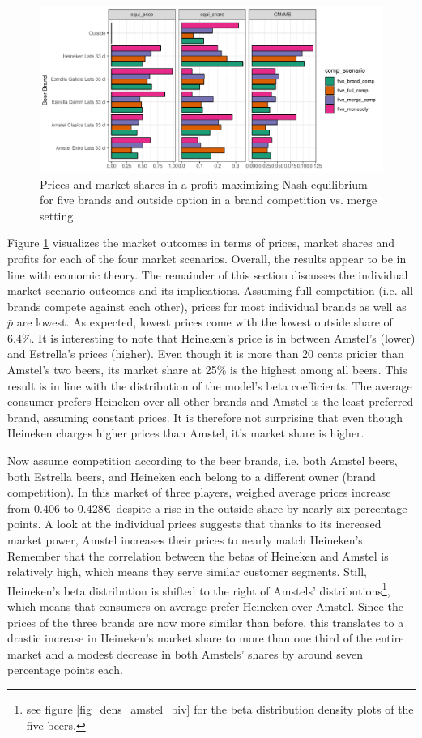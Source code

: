 \documentclass[12pt,a4paper]{article}
\begin{document}
\begin{figure}[ht]
	\centering
  \includegraphics[scale = 0.7]{figures/bar_price_share_brand_merge_5.pdf}
	\caption{Prices and market shares in a profit-maximizing Nash equilibrium for five brands and outside option in a brand competition vs. merge setting}
	\label{fig_bar_five}
\end{figure}

Figure \ref{fig_bar_five} visualizes the market outcomes in terms of prices, market shares and profits for each of the four market scenarios.
Overall, the results appear to be in line with economic theory.
The remainder of this section discusses the individual market scenario outcomes and its implications.
Assuming full competition (i.e. all brands compete against each other), prices for most individual brands as well as $\bar{p}$ are lowest.
As expected, lowest prices come with the lowest outside share of 6.4\%.
It is interesting to note that Heineken's price is in between Amstel's (lower) and Estrella's prices (higher).
Even though it is more than 20 cents pricier than Amstel's two beers, its market share at 25\% is the highest among all beers.
This result is in line with the distribution of the model's beta coefficients.
The average consumer prefers Heineken over all other brands and Amstel is the least preferred brand, assuming constant prices.
It is therefore not surprising that even though Heineken charges higher prices than Amstel, it's market share is higher.

Now assume competition according to the beer brands, i.e. both Amstel beers, both Estrella beers, and Heineken each belong to a different owner (brand competition).
In this market of three players, weighed average prices increase from 0.406 to 0.428\euro\ despite a rise in the outside share by nearly six percentage points.
A look at the individual prices suggests that thanks to its increased market power, Amstel increases their prices to nearly match Heineken's.
Remember that the correlation between the betas of Heineken and Amstel is relatively high, which means they serve similar customer segments.
Still, Heineken's beta distribution is shifted to the right of Amstels' distributions\footnote{see figure \ref{fig_dens_amstel_biv} for the beta distribution density plots of the five beers.}, which means that consumers on average prefer Heineken over Amstel.
Since the prices of the three brands are now more similar than before, this translates to a drastic increase in Heineken's market share to more than one third of the entire market and a modest decrease in both Amstels' shares by around seven percentage points each.
\end{document}

